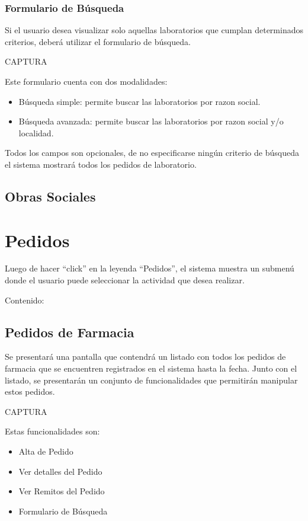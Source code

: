 \documentclass[letterpaper,10pt,spanish]{sphinxmanual}
\begin{document}
\subsection{Formulario de Búsqueda}
\label{laboratorios:formulario-de-busqueda}
Si el usuario desea visualizar solo aquellas laboratorios que cumplan determinados criterios, deberá utilizar el formulario de búsqueda.

CAPTURA

Este formulario cuenta con dos modalidades:
\begin{itemize}
\item {} 
Búsqueda simple: permite buscar las laboratorios por razon social.

\item {} 
Búsqueda avanzada: permite buscar las laboratorios por razon social y/o localidad.

\end{itemize}

Todos los campos son opcionales, de no especificarse ningún criterio de búsqueda el sistema mostrará todos los pedidos de laboratorio.


\section{Obras Sociales}
\label{obras::doc}\label{obras:obras-sociales}

\chapter{Pedidos}
\label{pedidos::doc}\label{pedidos:pedidos}
Luego de hacer “click” en  la leyenda “Pedidos”, el sistema muestra un submenú donde el usuario puede seleccionar la actividad que desea realizar.

Contenido:


\section{Pedidos de Farmacia}
\label{pedidosfarmacia::doc}\label{pedidosfarmacia:pedidos-de-farmacia}
Se presentará una pantalla que contendrá un listado con todos los pedidos de farmacia que se encuentren registrados en el sistema hasta la fecha. Junto con el listado, se presentarán un conjunto de funcionalidades que permitirán manipular estos pedidos.

CAPTURA

Estas funcionalidades son:
\begin{itemize}
\item {} 
Alta de Pedido

\item {} 
Ver detalles del Pedido

\item {} 
Ver Remitos del Pedido

\item {} 
Formulario de Búsqueda

\end{itemize}
\end{document}

